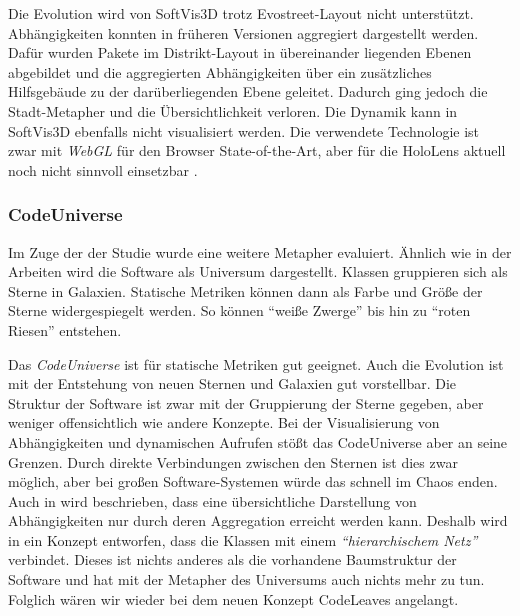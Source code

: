 Die Evolution wird von SoftVis3D trotz Evostreet-Layout nicht unterstützt. Abhängigkeiten konnten in früheren Versionen aggregiert dargestellt werden. Dafür wurden Pakete im Distrikt-Layout in übereinander liegenden Ebenen abgebildet und die aggregierten Abhängigkeiten über ein zusätzliches Hilfsgebäude zu der darüberliegenden Ebene geleitet. Dadurch ging jedoch die Stadt-Metapher und die Übersichtlichkeit verloren. Die Dynamik kann in SoftVis3D ebenfalls nicht visualisiert werden. Die verwendete Technologie ist zwar mit \emph{WebGL} für den Browser State-of-the-Art, aber für die HoloLens aktuell noch nicht sinnvoll einsetzbar \cite{puetz2017softwarevisualisierung}.

\subsubsection*{CodeUniverse}

Im Zuge der der Studie \cite{puetz2017softwarevisualisierung} wurde eine weitere Metapher evaluiert. Ähnlich wie in der Arbeiten \cite{graham2004solar, balzer2004software} wird die Software als Universum dargestellt. Klassen gruppieren sich als Sterne in Galaxien. Statische Metriken können dann als Farbe und Größe der Sterne widergespiegelt werden. So können "`weiße Zwerge"' bis hin zu "`roten Riesen"' entstehen.

Das \textit{CodeUniverse} ist für statische Metriken gut geeignet. Auch die Evolution ist mit der Entstehung von neuen Sternen und Galaxien gut vorstellbar. Die Struktur der Software ist zwar mit der Gruppierung der Sterne gegeben, aber weniger offensichtlich wie andere Konzepte. Bei der Visualisierung von Abhängigkeiten und dynamischen Aufrufen stößt das CodeUniverse aber an seine Grenzen. Durch direkte Verbindungen zwischen den Sternen ist dies zwar möglich, aber bei großen Software-Systemen würde das schnell im Chaos enden. Auch in \cite{balzer2004software} wird beschrieben, dass eine übersichtliche Darstellung von Abhängigkeiten nur durch deren Aggregation erreicht werden kann. Deshalb wird in \cite{balzer2004software} ein Konzept entworfen, dass die Klassen mit einem \emph{"`hierarchischem Netz"'} verbindet. Dieses ist nichts anderes als die vorhandene Baumstruktur der Software und hat mit der Metapher des Universums auch nichts mehr zu tun. Folglich wären wir wieder bei dem neuen Konzept CodeLeaves angelangt.


